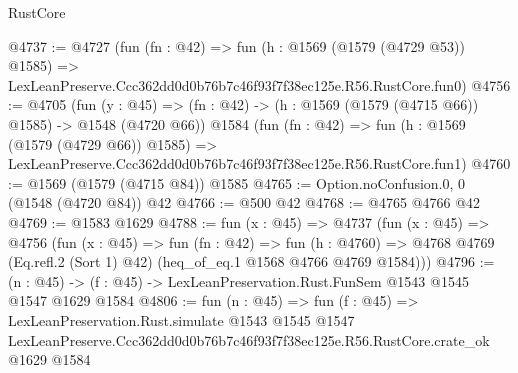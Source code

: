 \begin{lexlean}{RustCore}
\begin{coremodule}
@4737 := @4727
    (fun (fn : @42) =>
    fun (h : @1569 (@1579 (@4729 @53)) @1585) =>
    LexLeanPreserve.Ccc362dd0d0b76b7c46f93f7f38ec125e.R56.RustCore.fun0)
@4756 := @4705
    (fun (y : @45) => (fn : @42) -> (h : @1569 (@1579 (@4715 @66)) @1585) -> @1548 (@4720 @66))
    @1584
    (fun (fn : @42) =>
    fun (h : @1569 (@1579 (@4729 @66)) @1585) =>
    LexLeanPreserve.Ccc362dd0d0b76b7c46f93f7f38ec125e.R56.RustCore.fun1)
@4760 := @1569 (@1579 (@4715 @84)) @1585
@4765 := Option.noConfusion.{0, 0} (@1548 (@4720 @84)) @42
@4766 := @500 @42
@4768 := @4765 @4766 @42
@4769 := @1583 @1629
@4788 := fun (x : @45) =>
  @4737
    (fun (x : @45) =>
    @4756
      (fun (x : @45) =>
      fun (fn : @42) =>
      fun (h : @4760) =>
      @4768 @4769 (Eq.refl.{2} (Sort 1) @42) (heq_of_eq.{1} @1568 @4766 @4769 @1584)))
@4796 := (n : @45) -> (f : @45) -> LexLeanPreservation.Rust.FunSem @1543 @1545 @1547 @1629 @1584
@4806 := fun (n : @45) =>
  fun (f : @45) =>
  LexLeanPreservation.Rust.simulate
    @1543
    @1545
    @1547
    LexLeanPreserve.Ccc362dd0d0b76b7c46f93f7f38ec125e.R56.RustCore.crate_ok
    @1629
    @1584
\end{coremodule}
\end{lexlean}
